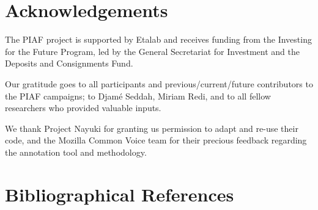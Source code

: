 \documentclass[10pt, a4paper]{article}
\begin{document}
\section{Acknowledgements}
The PIAF project is supported by Etalab and receives funding from the Investing for the Future Program, led by the General Secretariat for Investment and the  Deposits and Consignments Fund. 

Our gratitude goes to all participants and previous/current/future contributors to the PIAF campaigns; to Djamé Seddah, Miriam Redi, and to all fellow researchers who provided valuable inputs.

We thank Project Nayuki for granting us permission to adapt and re-use their code, and the Mozilla Common Voice team for their precious feedback regarding the annotation tool and methodology. 



























































\clearpage
\section{Bibliographical References}
\label{main:ref}



\end{document}
